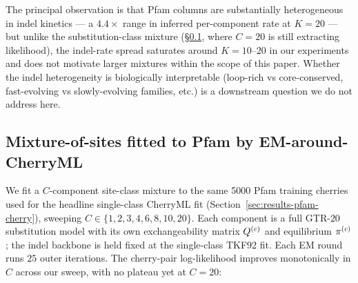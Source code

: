 The principal observation is that Pfam columns are
substantially heterogeneous in indel kinetics --- a $4.4\times$
range in inferred per-component rate at $K = 20$ --- but
unlike the substitution-class mixture
(\S\ref{sec:results-mixture-sites}, where $C = 20$ is still
extracting likelihood), the indel-rate spread saturates around
$K = 10$--$20$ in our experiments and does not motivate larger
mixtures within the scope of this paper.  Whether the indel
heterogeneity is biologically interpretable (loop-rich vs
core-conserved, fast-evolving vs slowly-evolving families,
etc.) is a downstream question we do not address here.

\subsection{Mixture-of-sites fitted to Pfam by EM-around-CherryML}
\label{sec:results-mixture-sites}


We fit a $C$-component site-class mixture to the same 5000 Pfam
training cherries used for the headline single-class CherryML fit
(Section~\ref{sec:results-pfam-cherry}), sweeping $C \in \{1, 2,
3, 4, 6, 8, 10, 20\}$.  Each component is a full GTR-$20$
substitution model with its own exchangeability matrix
$Q^{(c)}$ and equilibrium $\pi^{(c)}$; the indel backbone is
held fixed at the single-class TKF92 fit.  Each EM round runs
$25$ outer iterations.  The cherry-pair log-likelihood improves
monotonically in $C$ across our sweep, with no plateau yet at
$C = 20$:

